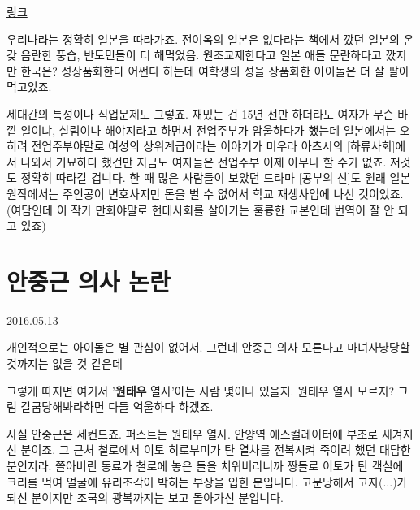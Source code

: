 \vspace{5mm}

\href{http://news.naver.com/main/read.nhn?mode=LSD&mid=sec&sid1=104&oid=001&aid=0008395996}{링크}   

\vspace{5mm}

우리나라는 정확히 일본을 따라가죠.   전여옥의 일본은 없다라는 책에서 깠던 일본의 온갖 음란한 풍습, 반도민들이 더 해먹었음.   원조교제한다고 일본 애들 문란하다고 깠지만 한국은?   성상품화한다 어쩐다 하는데 여학생의 성을 상품화한 아이돌은 더 잘 팔아먹고있죠.   

\vspace{5mm}


세대간의 특성이나 직업문제도 그렇죠.   재밌는 건 15년 전만 하더라도 여자가 무슨 바깥 일이냐, 살림이나 해야지라고 하면서 전업주부가 암울하다가 했는데   일본에서는 오히려 전업주부야말로 여성의 상위계급이라는 이야기가 미우라 아츠시의 [하류사회]에서 나와서 기묘하다 했건만   지금도 여자들은 전업주부 이제 아무나 할 수가 없죠.   저것도 정확히 따라갈 겁니다.   한 때 많은 사람들이 보았던 드라마 [공부의 신]도    원래 일본 원작에서는 주인공이 변호사지만 돈을 벌 수 없어서 학교 재생사업에 나선 것이었죠.   (여담인데 이 작가 만화야말로 현대사회를 살아가는 훌륭한 교본인데 번역이 잘 안 되고 있죠)





\section{안중근 의사 논란}
\href{https://www.kockoc.com/Apoc/772476}{2016.05.13}

\vspace{5mm}

개인적으로는 아이돌은 별 관심이 없어서.
그런데 안중근 의사 모른다고 마녀사냥당할 것까지는 없을 것 같은데
\vspace{5mm}

그렇게 따지면 여기서 '\textbf{원태우} 열사'아는 사람 몇이나 있을지.
원태우 열사 모르지? 그럼 갈굼당해봐라하면 다들 억울하다 하겠죠.
\vspace{5mm}

사실 안중근은 세컨드죠. 퍼스트는 원태우 열사.
안양역 에스컬레이터에 부조로 새겨지신 분이죠. 그 근처 철로에서 이토 히로부미가 탄 열차를 전복시켜 죽이려 했던 대담한 분인지라.
쫄아버린 동료가 철로에 놓은 돌을 치워버리니까 짱돌로 이토가 탄 객실에 크리를 먹여 얼굴에 유리조각이 박히는 부상을 입힌 분입니다.
고문당해서 고자(...)가 되신 분이지만 조국의 광복까지는 보고 돌아가신 분입니다.
\vspace{5mm}

